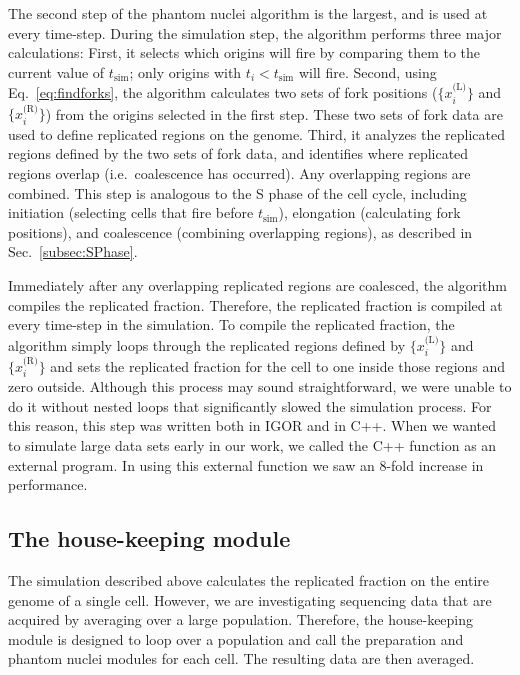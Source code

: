 		The second step of the phantom nuclei algorithm is the largest, and is used at every time-step.
		During the simulation step, the algorithm performs three major calculations:
		First, it selects which origins will fire by comparing them to the current value of $t_\text{sim}$; only origins with $t_i < t_\text{sim}$ will fire.
		Second, using Eq.~\ref{eq:findforks}, the algorithm calculates two sets of fork positions ($\{x_i^\text{(L)}\}$ and $\{x_i^\text{(R)}\}$) from the origins selected in the first step.
		These two sets of fork data are used to define replicated regions on the genome.
		Third, it analyzes the replicated regions defined by the two sets of fork data, and identifies where replicated regions overlap (i.e.\ coalescence has occurred).
		Any overlapping regions are combined.
		This step is analogous to the S phase of the cell cycle, including initiation (selecting cells that fire before $t_\text{sim}$), elongation (calculating fork positions), and coalescence (combining overlapping regions), as described in Sec.~\ref{subsec:SPhase}.
		
		Immediately after any overlapping replicated regions are coalesced, the algorithm compiles the replicated fraction.
		Therefore, the replicated fraction is compiled at every time-step in the simulation.
		To compile the replicated fraction, the algorithm simply loops through the replicated regions defined by $\{x_i^\text{(L)}\}$ and $\{x_i^\text{(R)}\}$ and sets the replicated fraction for the cell to one inside those regions and zero outside.
		Although this process may sound straightforward, we were unable to do it without nested loops that significantly slowed the simulation process.
		For this reason, this step was written both in IGOR and in C++.
		When we wanted to simulate large data sets early in our work, we called the C++ function as an external program.
		In using this external function we saw an 8-fold increase in performance.
		
		
		\subsection{The house-keeping module}
		\label{subsec:Housing}
		
		The simulation described above calculates the replicated fraction on the entire genome of a single cell.
		However, we are investigating sequencing data that are acquired by averaging over a large population.
		Therefore, the house-keeping module is designed to loop over a population and call the preparation and phantom nuclei modules for each cell.
		The resulting data are then averaged.
		
